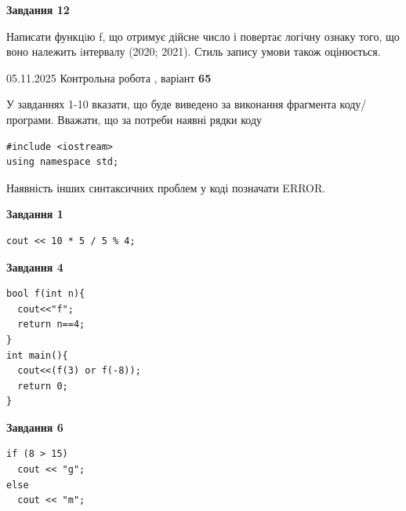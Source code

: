 \documentclass[12pt, ukrainian]{article}
\begin{document}
{\begin {large}
\begin{minipage}[t]{11.0cm}
\begin{center}
\textbf{Завдання 12}
\end{center}

Написати функцiю f, що отримує дійсне число і повертає логічну ознаку того, що воно належить iнтервалу (2020; 2021). Стиль запису умови також оцінюється.\par

\end{minipage}

\end {large}}
\newpage

{\Large{05.11.2025 Контрольна робота , варіант  \No \textbf { 65 }\par}}
{
\begin {large}
У завданнях 1-10 вказати, що буде виведено за виконання фрагмента коду/про\-гра\-ми.
Вважати, що за потреби наявні рядки коду
\begin{verbatim}
#include <iostream>
using namespace std;
\end{verbatim}
Наявність інших синтаксичних проблем у коді позначати ERROR.

\begin{minipage}[t]{7.0cm}

\begin{center}
\textbf{Завдання 1}
\end{center}
\vspace{-8mm}

\begin{verbatim}
cout << 10 * 5 / 5 % 4;
\end{verbatim}



\begin{center}
\textbf{Завдання 4}
\end{center}
\vspace{-8mm}

\begin{verbatim}
bool f(int n){
  cout<<"f";
  return n==4;
}
int main(){
  cout<<(f(3) or f(-8));
  return 0;
}
\end{verbatim}



\begin{center}
\textbf{Завдання 6}
\end{center}
\vspace{-8mm}

\begin{verbatim}
if (8 > 15)
  cout << "g";
else
  cout << "m";
\end{verbatim}




\end{minipage}
\end{large}}
\end{document}
